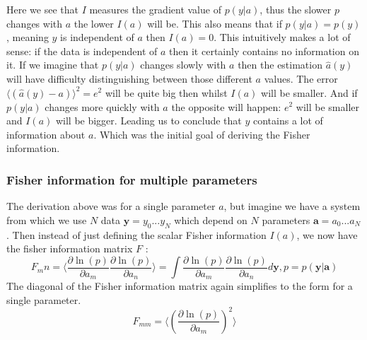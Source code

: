 \documentclass[a4paper]{article}
\begin{document}
Here we see that $I$ measures the gradient value of $p(y|a)$, thus the slower $p$ changes with $a$ the lower $I(a)$ will be. This also means that if $p(y|a) = p(y)$, meaning $y$ is independent of $a$ then $I(a) = 0$. This intuitively makes a lot of sense: if the data is independent of $a$ then it certainly contains no information on it. If we imagine that $p(y|a)$ changes slowly with $a$ then the estimation $\hat{a}(y)$ will have difficulty distinguishing between those different $a$ values. The error $\langle (\hat{a} (y) - a) \rangle^2 = e^2$ will be quite big then whilst $I(a)$ will be smaller. And if $p(y|a)$ changes more quickly with $a$ the opposite will happen: $e^2$ will be smaller and $I(a)$ will be bigger. Leading us to conclude that $y$ contains a lot of information about $a$. Which was the initial goal of deriving the Fisher information.

\subsubsection{Fisher information for multiple parameters}
The derivation above was for a single parameter $a$, but imagine we have a system from which we use $N$ data $\bm{y} = y_0...y_N$ which depend on $N$ parameters $\bm{a} = a_0...a_N$. Then instead of just defining the scalar Fisher information $I(a)$, we now have the fisher information matrix $F$ \cite[p. ~13]{Fisher}: 
\begin{equation}
F_mn = \langle  \frac{\partial \ln(p)}{\partial a_m} \frac{\partial \ln(p)}{\partial a_n} \rangle = \int \frac{\partial \ln(p)}{\partial a_m} \frac{\partial \ln(p)}{\partial a_n} d\bm{y} , p=p(\bm{y}|\bm{a}) 
\end{equation}
The diagonal of the Fisher information matrix again simplifies to the form for a single parameter.
\begin{equation}
F_{mm} = \langle (\frac{\partial \ln(p)}{\partial a_m})^2 \rangle
\end{equation}
\end{document}

